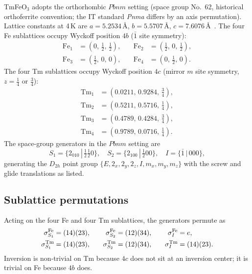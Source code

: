 \documentclass[reprint,amsmath,amssymb,aps,prb,longbibliography]{revtex4-2}
\newcommand{\half}{\tfrac{1}{2}}
\begin{document}
TmFeO$_3$ adopts the orthorhombic $Pbnm$ setting (space group No.~62,
historical orthoferrite convention; the IT standard \emph{Pnma} differs
by an axis permutation). Lattice constants at 4\,K are $a=5.2534$\,\AA,
$b=5.5707$\,\AA, $c=7.6076$\,\AA~\cite{Marezio1970}. The four Fe
sublattices occupy Wyckoff position $4b$ ($\bar 1$ site symmetry):
\begin{equation}
\begin{aligned}
\mathrm{Fe}_1 &= (0,\,\half,\,\half), &\quad
\mathrm{Fe}_2 &= (\half,\,0,\,\half), \\
\mathrm{Fe}_3 &= (\half,\,0,\,0), &\quad
\mathrm{Fe}_4 &= (0,\,\half,\,0).
\end{aligned}
\label{eq:Fepos}
\end{equation}
The four Tm sublattices occupy Wyckoff position $4c$ (mirror $m$ site
symmetry, $z=\frac{1}{4}$ or $\frac{3}{4}$):
\begin{equation}
\begin{aligned}
\mathrm{Tm}_1 &= (0.0211,\,0.9284,\,\tfrac{3}{4}), \\
\mathrm{Tm}_2 &= (0.5211,\,0.5716,\,\tfrac{1}{4}), \\
\mathrm{Tm}_3 &= (0.4789,\,0.4284,\,\tfrac{3}{4}), \\
\mathrm{Tm}_4 &= (0.9789,\,0.0716,\,\tfrac{1}{4}).
\end{aligned}
\label{eq:Tmpos}
\end{equation}
The space-group generators in the $Pbnm$ setting are
\begin{equation}
S_1=\{2_{010}\,|\,\tfrac{1}{2}\tfrac{1}{2}0\},\quad
S_2=\{2_{100}\,|\,\tfrac{1}{2}00\},\quad I=\{\bar 1\,|\,000\},
\label{eq:Pbnmgens}
\end{equation}
generating the $D_{2h}$ point group $\{E,2_x,2_y,2_z,I,m_x,m_y,m_z\}$ with
the screw and glide translations as listed.

\subsection{Sublattice permutations}

Acting on the four Fe and four Tm sublattices, the generators
permute as
\begin{equation}
\begin{aligned}
\sigma^{\rm Fe}_{S_1}&=(14)(23), &\quad
\sigma^{\rm Fe}_{S_2}&=(12)(34), &\quad
\sigma^{\rm Fe}_{I}&=e,\\
\sigma^{\rm Tm}_{S_1}&=(14)(23), &\quad
\sigma^{\rm Tm}_{S_2}&=(12)(34), &\quad
\sigma^{\rm Tm}_{I}&=(14)(23).
\end{aligned}
\label{eq:sigmag}
\end{equation}
Inversion is non-trivial on Tm because $4c$ does not sit at an inversion
center; it is trivial on Fe because $4b$ does.
\end{document}
